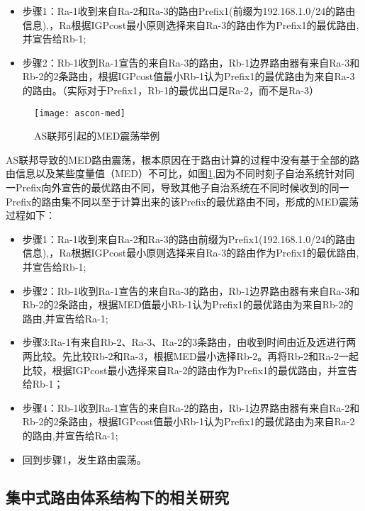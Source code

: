 \begin{itemize}
\item 步骤1：Ra-1收到来自Ra-2和Ra-3的路由Prefix1(前缀为192.168.1.0/24的路由信息),，Ra根据IGPcost最小原则选择来自Ra-3的路由作为Prefix1的最优路由,并宣告给Rb-1;
\item 步骤2：Rb-1收到Ra-1宣告的来自Ra-3的路由，Rb-1边界路由器有来自Ra-3和Rb-2的2条路由，根据IGPcost值最小Rb-1认为Prefix1的最优路由为来自Ra-3的路由。（实际对于Prefix1，Rb-1的最优出口是Ra-2，而不是Ra-3）\\
\end{itemize}


\begin{figure}
  \centering
  \texttt{[image: ascon-med]}
  \caption{AS联邦引起的MED震荡举例}
  \label{fig:ascon-med}
\end{figure}

AS联邦导致的MED路由震荡\cite{rfc3345}，根本原因在于路由计算的过程中没有基于全部的路由信息以及某些度量值（MED）不可比，如图\ref{fig:ascon-med},因为不同时刻子自治系统针对同一Prefix向外宣告的最优路由不同，导致其他子自治系统在不同时候收到的同一Prefix的路由集不同以至于计算出来的该Prefix的最优路由不同，形成的MED震荡过程如下：


\begin{itemize}
  \item 步骤1：Ra-1收到来自Ra-2和Ra-3的路由前缀为Prefix1(192.168.1.0/24的路由信息),，Ra根据IGPcost最小原则选择来自Ra-3的路由作为Prefix1的最优路由,并宣告给Rb-1;
  \item 步骤2：Rb-1收到Ra-1宣告的来自Ra-3的路由，Rb-1边界路由器有来自Ra-3和Rb-2的2条路由，根据MED值最小Rb-1认为Prefix1的最优路由为来自Rb-2的路由,并宣告给Ra-1;
  \item 步骤3:Ra-1有来自Rb-2、Ra-3、Ra-2的3条路由，由收到时间由近及远进行两两比较。先比较Rb-2和Ra-3，根据MED最小选择Rb-2。再将Rb-2和Ra-2一起比较，根据IGPcost最小选择来自Ra-2的路由作为Prefix1的最优路由，并宣告给Rb-1；
  \item 步骤4：Rb-1收到Ra-1宣告的来自Ra-2的路由，Rb-1边界路由器有来自Ra-2和Rb-2的2条路由，根据IGPcost值最小Rb-1认为Prefix1的最优路由为来自Ra-2的路由,并宣告给Ra-1;
  \item 回到步骤1，发生路由震荡。
\end{itemize}

\subsection{集中式路由体系结构下的相关研究}

